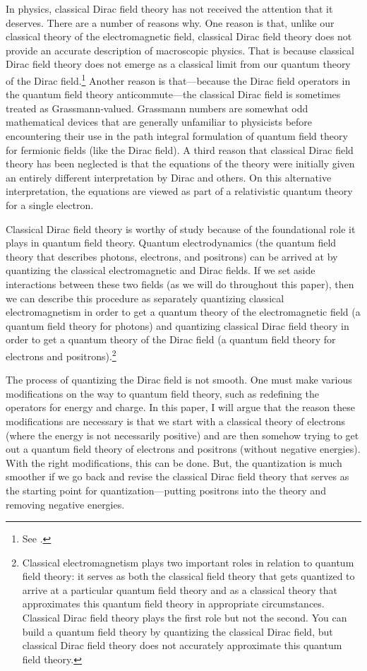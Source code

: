 \documentclass[12pt,secnumarabic,amsmath,amssymb,balancelastpage,nofootinbib]{article}
\begin{document}
In physics, classical Dirac field theory has not received the attention that it deserves.  There are a number of reasons why.  One reason is that, unlike our classical theory of the electromagnetic field, classical Dirac field theory does not provide an accurate description of macroscopic physics.  That is because classical Dirac field theory does not emerge as a classical limit from our quantum theory of the Dirac field.\footnote{See \citet[pg.\ 221]{duncan}.}  Another reason is that---because the Dirac field operators in the quantum field theory anticommute---the classical Dirac field is sometimes treated as Grassmann-valued.  Grassmann numbers are somewhat odd mathematical devices that are generally unfamiliar to physicists before encountering their use in the path integral formulation of quantum field theory for fermionic fields (like the Dirac field).  A third reason that classical Dirac field theory has been neglected is that the equations of the theory were initially given an entirely different interpretation by Dirac and others.  On this alternative interpretation, the equations are viewed as part of a relativistic quantum theory for a single electron.

Classical Dirac field theory is worthy of study because of the foundational role it plays in quantum field theory.  Quantum electrodynamics (the quantum field theory that describes photons, electrons, and positrons) can be arrived at by quantizing the classical electromagnetic and Dirac fields.  If we set aside interactions between these two fields (as we will do throughout this paper), then we can describe this procedure as separately quantizing classical electromagnetism in order to get a quantum theory of the electromagnetic field (a quantum field theory for photons) and quantizing classical Dirac field theory in order to get a quantum theory of the Dirac field (a quantum field theory for electrons and positrons).\footnote{Classical electromagnetism plays two important roles in relation to quantum field theory: it serves as both the classical field theory that gets quantized to arrive at a particular quantum field theory and as a classical theory that approximates this quantum field theory in appropriate circumstances.  Classical Dirac field theory plays the first role but not the second.  You can build a quantum field theory by quantizing the classical Dirac field, but classical Dirac field theory does not accurately approximate this quantum field theory.}

The process of quantizing the Dirac field is not smooth.  One must make various modifications on the way to quantum field theory, such as redefining the operators for energy and charge.  In this paper, I will argue that the reason these modifications are necessary is that we start with a classical theory of electrons (where the energy is not necessarily positive) and are then somehow trying to get out a quantum field theory of electrons and positrons (without negative energies).  With the right modifications, this can be done.  But, the quantization is much smoother if we go back and revise the classical Dirac field theory that serves as the starting point for quantization---putting positrons into the theory and removing negative energies.
\end{document}
